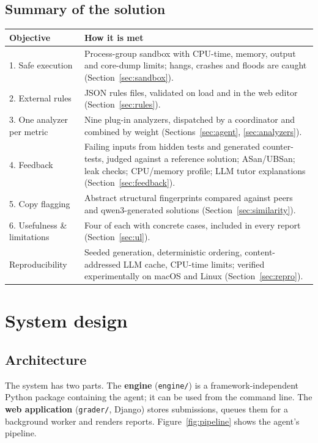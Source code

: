 \documentclass[11pt,a4paper]{article}
\newcommand{\file}[1]{\nolinkurl{#1}}
\begin{document}
\subsection{Summary of the solution}
\begin{longtable}{@{}P{3.8cm}P{11.2cm}@{}}
\toprule
\textbf{Objective} & \textbf{How it is met} \\
\midrule
{}. Safe execution & Process-group sandbox with CPU-time, memory, output and core-dump limits; hangs, crashes and floods are caught (Section~\ref{sec:sandbox}). \\
2. External rules & JSON rules files, validated on load and in the web editor (Section~\ref{sec:rules}). \\
3. One analyzer per metric & Nine plug-in analyzers, dispatched by a coordinator and combined by weight (Sections~\ref{sec:agent}, \ref{sec:analyzers}). \\
4. Feedback & Failing inputs from hidden tests and generated counter-tests, judged against a reference solution; ASan/UBSan; leak checks; CPU/memory profile; LLM tutor explanations (Section~\ref{sec:feedback}). \\
5. Copy flagging & Abstract structural fingerprints compared against peers and qwen3-generated solutions (Section~\ref{sec:similarity}). \\
6. Usefulness \& limitations & Four of each with concrete cases, included in every report (Section~\ref{sec:ul}). \\
Reproducibility & Seeded generation, deterministic ordering, content-addressed LLM cache, CPU-time limits; verified experimentally on macOS and Linux (Section~\ref{sec:repro}). \\
\bottomrule
\end{longtable}

\section{System design}
\subsection{Architecture}
The system has two parts. The \textbf{engine} (\file{engine/}) is a framework-independent Python package containing the
agent; it can be used from the command line. The \textbf{web application} (\file{grader/}, Django) stores submissions,
queues them for a background worker and renders reports. Figure~\ref{fig:pipeline} shows the agent's pipeline.
\end{document}
